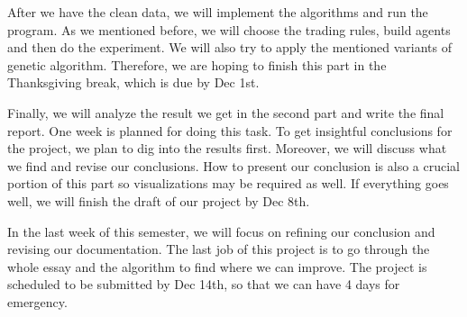 \documentclass{article}
\begin{document}
After we have the clean data, we will implement the algorithms and run the program.
As we mentioned before, we will choose the trading rules, build agents and then do the experiment.
We will also try to apply the mentioned variants of genetic algorithm.
Therefore, we are hoping to finish this part in the Thanksgiving break,
which is due by Dec 1st.

Finally, we will analyze the result we get in the second part and write the final report.
One week is planned for doing this task.
To get insightful conclusions for the project, we plan to dig into the results first.
Moreover, we will discuss what we find and revise our conclusions.
How to present our conclusion is also a crucial portion of this part so visualizations may be required as well.
If everything goes well, we will finish the draft of our project by Dec 8th.

In the last week of this semester, we will focus on refining our conclusion and revising our documentation.
The last job of this project is to go through the whole essay and the algorithm to find where we can improve.
The project is scheduled to be submitted by Dec 14th, so that we can have 4 days for emergency.




\end{document}
